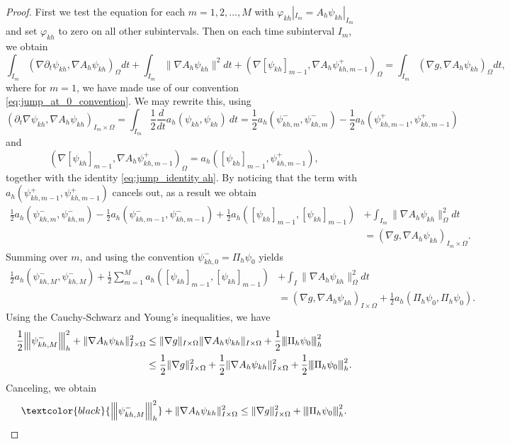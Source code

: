 \documentclass{m2an}
\newcommand{\1}{\mathds{1}}
\newcommand{\Om}{\Omega}
\newcommand{\revB}[1]{\textcolor{black}{#1}}
\newcommand{\na}{\nabla}
\newcommand{\IOm}{I\times \Om}
\newcommand{\ImOm}{I_m\times \Om}
\newcommand{\vertiii}[1]{{\left\vert\kern-0.25ex\left\vert\kern-0.25ex\left\vert #1
    \right\vert\kern-0.25ex\right\vert\kern-0.25ex\right\vert}}
\theoremstyle{definition}
\begin{document}
\begin{proof}
  First we test the equation for each $m=1,2,...,M$ with $\varphi_{kh}|_{I_m} =A_h\psi_{kh}|_{I_m}$ and set 
  $\varphi_{kh}$ to zero on all other subintervals. Then on each time subinterval $I_m$, we obtain
$$
\int_{I_m}(\na \partial_t \psi_{kh},\na A_h\psi_{kh} )_\Omega dt+\int_{I_m}\|\na A_h \psi_{kh}\|^2dt +(\na [\psi_{kh}]_{m-1}, \na A_h \psi_{kh,m-1}^+)_\Om=\int_{I_m}(\na g,\na A_h \psi_{kh})_\Omega dt,
$$
where for $m=1$, we have made use of our convention \eqref{eq:jump_at_0_convention}.
We may rewrite this, using
$$
(\partial_t \na \psi_{kh},\na A_h \psi_{kh})_{\ImOm} =\int_{I_m}\frac{1}{2}\frac{d}{dt}a_h(\psi_{kh},\psi_{kh})\ dt = \frac{1}{2}a_h(\psi_{kh,m}^-,\psi_{kh,m}^-)-\frac{1}{2}a_h(\psi_{kh,m-1}^+,\psi_{kh,m-1}^+)
$$
and
$$
(\na [\psi_{kh}]_{m-1}, \na A_h \psi_{kh,m-1}^+)_\Om=a_h([\psi_{kh}]_{m-1},\psi^+_{kh,m-1}),
$$
together with the identity \eqref{eq:jump_identity ah}.
By noticing that the term with $a_h(\psi_{kh,m-1}^+,\psi_{kh,m-1}^+)$ cancels out, as a result
we obtain
$$
\begin{aligned}
\frac{1}{2}a_h(\psi_{kh,m}^-,\psi_{kh,m}^-)-\frac{1}{2}a_h(\psi_{kh,m-1}^-,\psi_{kh,m-1}^-)+\frac{1}{2}a_h([\psi_{kh}]_{m-1},[\psi_{kh}]_{m-1}) &+\int_{I_m}\|\na A_h \psi_{kh}\|_\Om^2dt\\&=(\na g, \na A_h \psi_{kh})_{\ImOm}.
\end{aligned}
$$
Summing over $m$, and using the convention $\psi_{kh,0}^- = \Pi_h \psi_0$ yields
$$
\begin{aligned}
\frac{1}{2}a_h(\psi_{kh,M}^-,\psi_{kh,M}^-)+\frac{1}{2}\sum_{m=1}^Ma_h([\psi_{kh}]_{m-1},[\psi_{kh}]_{m-1})&+\int_I \|\na A_h \psi_{kh}\|_\Om^2dt\\
&=(\na g,\na A_h\psi_{kh})_{\IOm}+\frac{1}{2}a_h(\Pi_h\psi_0,\Pi_h\psi_0).
\end{aligned}
$$
Using the Cauchy-Schwarz and Young's inequalities, we have
\revB{
$$
\begin{aligned}
\frac{1}{2} \vertiii{\psi_{kh,M}^-}^2_h + \|\na A_h \psi_{kh}\|^2_{\IOm} &\le \|\na g\|_{I\times \Om}\|\na A_h\psi_{kh}\|_{\IOm}+\frac{1}{2}\vertiii{\Pi_h\psi_0}_h^2\\
&\le \frac{1}{2}\|\na g\|_{I\times \Om}^2+\frac{1}{2}\|\na A_h\psi_{kh}\|^2_{\IOm}+\frac{1}{2}\vertiii{\Pi_h\psi_0}_h^2.
\end{aligned}
 $$
}
Canceling, we obtain
\begin{equation}\label{eq: estimates for integral of ah}
\revB{\vertiii{\psi_{kh,M}^-}^2_h}+ \|\na A_h \psi_{kh}\|^2_{\IOm}\le \|\na g\|^2_{I\times \Om}+\vertiii{\Pi_h\psi_0}_h^2.
\end{equation}



\end{proof}
\end{document}
